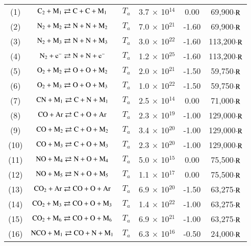 \documentclass{warpdoc}
\begin{document}
\begin{table}[!h]
\begin{center}
\begin{threeparttable}
\begin{tabular}{cccccc}
(1) & $\rm C_2 + M_1 \rightleftarrows C + C + M_1$ \tnote{1} & $T_a$ & 3.7 $\times$ 10$^{14}$  & 0.00 & 69,900$\cdot \rm R$ \tnote{7} \\
(2) & $\rm N_2 + M_2 \rightleftarrows N + N + M_2$ \tnote{2} & $T_a$ & 7.0 $\times$ 10$^{21}$  & -1.60 & 69,900$\cdot \rm R$ \\
(3) & $\rm N_2 + M_3 \rightleftarrows N + N + M_3$ \tnote{3} & $T_a$ & 3.0 $\times$ 10$^{22}$  & -1.60 & 113,200$\cdot \rm R$ \\
(4) & $\rm N_2 + e^- \rightleftarrows N + N + e^-$ & $T_a$ & 1.2 $\times$ 10$^{25}$  & -1.60 & 113,200$\cdot \rm R$ \\
(5) & $\rm O_2 + M_2 \rightleftarrows O + O + M_2$ \tnote{2} & $T_a$ & 2.0 $\times$ 10$^{21}$  & -1.50 & 59,750$\cdot \rm R$ \\
(6) & $\rm O_2 + M_3 \rightleftarrows O + O + M_3$ \tnote{3} & $T_a$ & 1.0 $\times$ 10$^{22}$  & -1.50 & 59,750$\cdot \rm R$ \\
(7) & $\rm CN + M_1 \rightleftarrows C + N + M_1$ \tnote{1} & $T_a$ & 2.5 $\times$ 10$^{14}$  & 0.00 & 71,000$\cdot \rm R$ \\
(8) & $\rm CO + Ar \rightleftarrows C + O + Ar$ & $T_a$ & 2.3 $\times$ 10$^{19}$  & -1.00 & 129,000$\cdot \rm R$ \\
(9) & $\rm CO + M_2 \rightleftarrows C + O + M_2$ \tnote{2} & $T_a$ & 3.4 $\times$ 10$^{20}$  & -1.00 & 129,000$\cdot \rm R$ \\
(10) & $\rm CO + M_3 \rightleftarrows C + O + M_3$ \tnote{3} & $T_a$ & 2.3 $\times$ 10$^{20}$  & -1.00 & 129,000$\cdot \rm R$ \\
(11) & $\rm NO + M_4 \rightleftarrows N + O + M_4$ \tnote{4} & $T_a$ & 5.0 $\times$ 10$^{15}$  & 0.00 & 75,500$\cdot \rm R$ \\
(12) & $\rm NO + M_5 \rightleftarrows N + O + M_5$ \tnote{5} & $T_a$ & 1.1 $\times$ 10$^{17}$  & 0.00 & 75,500$\cdot \rm R$ \\
(13) & $\rm CO_2 + Ar \rightleftarrows CO + O + Ar$ & $T_a$ & 6.9 $\times$ 10$^{20}$  & -1.50 & 63,275$\cdot \rm R$ \\
(14) & $\rm CO_2 + M_3 \rightleftarrows CO + O + M_3$ \tnote{3} & $T_a$ & 1.4 $\times$ 10$^{22}$  & -1.00 & 63,275$\cdot \rm R$ \\
(15) & $\rm CO_2 + M_6 \rightleftarrows CO + O + M_6$ \tnote{6} & $T_a$ & 6.9 $\times$ 10$^{21}$  & -1.00 & 63,275$\cdot \rm R$ \\
(16) & $\rm NCO + M_1 \rightleftarrows CO + N + M_1$ \tnote{1} & $T_a$ & 6.3 $\times$ 10$^{16}$  & -0.50 & 24,000$\cdot \rm R$ \\


\end{tabular}
\end{threeparttable}
\end{center}
\end{table}
\end{document}
